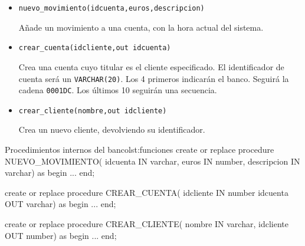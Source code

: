 \begin{homeworkProblem}


  \begin{itemize}
  \item \texttt{nuevo\_movimiento(idcuenta,euros,descripcion)}

    
    \begin{Indentado}
      Añade un movimiento a una cuenta, con la hora actual del sistema.
    \end{Indentado}
    
  \item \texttt{crear\_cuenta(idcliente,out idcuenta)}
    
    \begin{Indentado}
      Crea una cuenta cuyo titular es el cliente especificado.  El identificador de cuenta será un \texttt{VARCHAR(20)}. Los 4 primeros indicarán el banco. Seguirá la cadena \texttt{0001DC}. Los últimos 10 seguirán una secuencia.
    \end{Indentado}
    
    

    
  \item \texttt{crear\_cliente(nombre,out idcliente)}
    
    \begin{Indentado}
      Crea un nuevo cliente, devolviendo su identificador. \\
    \end{Indentado}
  \end{itemize}


  \begin{listadosql}{Procedimientos internos del banco}{lst:funciones}
create or replace procedure NUEVO_MOVIMIENTO(
  idcuenta IN varchar, 
  euros IN number,
  descripcion IN varchar)
as begin
  ...
end; 

create or replace procedure CREAR_CUENTA(
  idcliente IN number
  idcuenta OUT varchar)
as begin
  ...
end; 

create or replace procedure CREAR_CLIENTE(
  nombre IN varchar, 
  idcliente OUT  number)
as begin
  ...
end; 


\end{listadosql}


\end{homeworkProblem}

